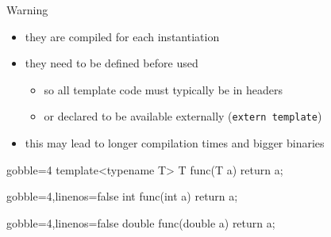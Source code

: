 \begin{frame}[fragile]
  \begin{alertblock}{Warning}
    \begin{itemize}
      \item they are compiled for each instantiation
      \item they need to be defined before used
      \begin{itemize}
        \item so all template code must typically be in headers
        \item or declared to be available externally (\texttt{extern template})
      \end{itemize}
      \item this may lead to longer compilation times and bigger binaries
    \end{itemize}
  \end{alertblock}
  \newsavebox{\codepiece}
  \begin{lrbox}{\codepiece}
    \begin{minipage}{.35\linewidth}
      \small
      \begin{cppcode*}{gobble=4}
        template<typename T>
        T func(T a) {
          return a;
        }
      \end{cppcode*}
    \end{minipage}
  \end{lrbox}
  \newsavebox{\codepiecea}
  \begin{lrbox}{\codepiecea}
    \begin{minipage}{.4\linewidth}
      \small
      \begin{cppcode*}{gobble=4,linenos=false}
        int func(int a) {
          return a;
        }
      \end{cppcode*}
    \end{minipage}
  \end{lrbox}
  \newsavebox{\codepieceb}
  \begin{lrbox}{\codepieceb}
    \begin{minipage}{.4\linewidth}
      \small
      \begin{cppcode*}{gobble=4,linenos=false}
        double func(double a) {
          return a;
        }
      \end{cppcode*}
    \end{minipage}
  \end{lrbox}
\end{frame}

